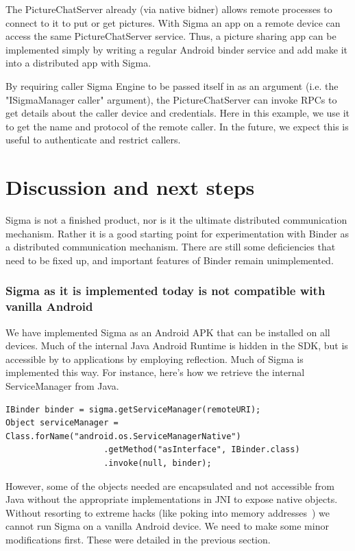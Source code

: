 \documentclass[prodmode]{acmlarge}
\begin{document}
The PictureChatServer already (via native bidner) allows remote processes to connect to it to put or get pictures. With Sigma an app on a remote device can access the same PictureChatServer service. Thus, a picture sharing app can be implemented simply by writing a regular Android binder service and add make it into a distributed app with Sigma.

By requiring caller Sigma Engine to be passed itself in as an argument (i.e. the "ISigmaManager caller" argument), the PictureChatServer can invoke RPCs to get details about the caller device and credentials. Here in this example, we use it to get the name and protocol of the remote caller. In the future, we expect this is useful to authenticate and restrict callers.

\section{Discussion and next steps}
Sigma is not a finished product, nor is it the ultimate distributed communication mechanism. Rather it is a good starting point for experimentation with Binder as a distributed communication mechanism. There are still some deficiencies that need to be fixed up, and important features of Binder remain unimplemented.

\subsubsection{Sigma as it is implemented today is not compatible with vanilla Android}
We have implemented Sigma as an Android APK that can be installed on all devices. Much of the internal Java Android Runtime is hidden in the SDK, but is accessible by to applications by employing reflection. Much of Sigma is implemented this way. For instance, here's how we retrieve the internal ServiceManager from Java.

\begin{Verbatim}[samepage=true]
IBinder binder = sigma.getServiceManager(remoteURI);
Object serviceManager = Class.forName("android.os.ServiceManagerNative")
                    .getMethod("asInterface", IBinder.class)
                    .invoke(null, binder);
\end{Verbatim}

However, some of the objects needed are encapsulated and not accessible from Java without the appropriate implementations in JNI to expose native objects. Without resorting to extreme hacks (like poking into memory addresses~\cite{FacebookDalvikHacks}) we cannot run Sigma on a vanilla Android device. We need to make some minor modifications first. These were detailed in the previous section.
\end{document}
